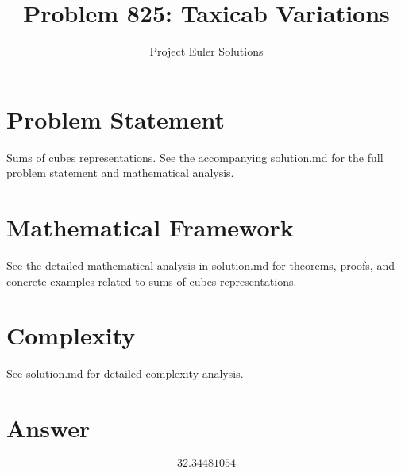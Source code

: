 \documentclass[11pt]{article}
\title{Problem 825: Taxicab Variations}
\author{Project Euler Solutions}
\date{}
\begin{document}
\maketitle

\section{Problem Statement}

Sums of cubes representations. See the accompanying solution.md for the full problem statement and mathematical analysis.

\section{Mathematical Framework}

See the detailed mathematical analysis in solution.md for theorems, proofs, and concrete examples related to sums of cubes representations.

\section{Complexity}

See solution.md for detailed complexity analysis.

\section{Answer}

\[
\boxed{32.34481054}
\]
\end{document}
